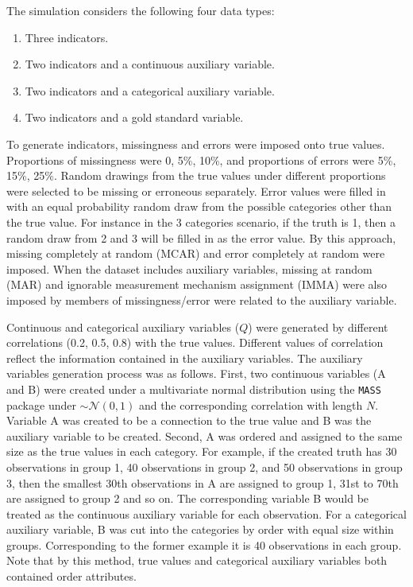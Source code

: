 \documentclass[oneside,a4paper]{article}
\begin{document}
The simulation considers the following four data types:
\begin{enumerate}
\item Three indicators.
\item Two indicators and a continuous auxiliary variable.
\item Two indicators and a categorical auxiliary variable.
\item Two indicators and a gold standard variable.
\end{enumerate}

To generate indicators, missingness and errors were imposed onto true values. Proportions of missingness were 0, 5\%, 10\%, and proportions of errors were 5\%, 15\%, 25\%. Random drawings from the true values under different proportions were selected to be missing or erroneous separately. Error values were filled in with an equal probability random draw from the possible categories other than the true value. For instance in the 3 categories scenario, if the truth is 1, then a random draw from 2 and 3 will be filled in as the error value. By this approach, missing completely at random (MCAR) and error completely at random were imposed. When the dataset includes auxiliary variables, missing at random (MAR) and ignorable measurement mechanism assignment (IMMA) were also imposed by members of missingness/error were related to the auxiliary variable.

Continuous and categorical auxiliary variables ($Q$) were generated by different correlations (0.2, 0.5, 0.8) with the true values. Different values of correlation reflect the information contained in the auxiliary variables. The auxiliary variables generation process was as follows. First, two continuous variables (A and B) were created under a multivariate normal distribution using the \texttt{MASS} package \cite{MASS} under $\sim \mathcal{N}(0,1)$ and the corresponding correlation with length $N$. Variable A was created to be a connection to the true value and B was the auxiliary variable to be created. Second, A was ordered and assigned to the same size as the true values in each category. For example, if the created truth has 30 observations in group 1, 40 observations in group 2, and 50 observations in group 3, then the smallest 30th observations in A are assigned to group 1, 31st to 70th are assigned to group 2 and so on. The corresponding variable B would be treated as the continuous auxiliary variable for each observation. For a categorical auxiliary variable, B was cut into the categories by order with equal size within groups. Corresponding to the former example it is 40 observations in each group. Note that by this method, true values and categorical auxiliary variables both contained order attributes.
\end{document}
